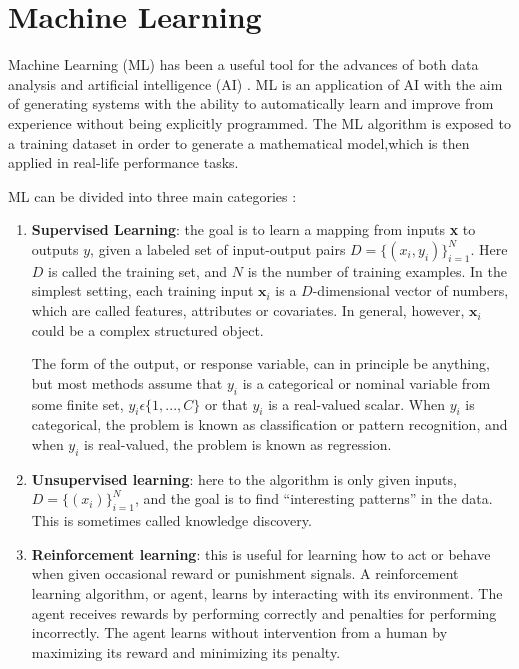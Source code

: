 \documentclass[a4paper, oneside]{book}
\begin{document}
		
		
	\chapter{Machine Learning}
		Machine Learning (ML) has been a useful tool for the advances of both data analysis and artificial intelligence (AI) \cite{Lifelong ML}. ML is an application of AI with the aim of generating systems with the ability to automatically learn and improve from experience without being explicitly programmed. The ML algorithm is exposed to a training dataset in order to generate a mathematical model,which is then applied in real-life performance tasks. %
		
		ML can be divided into three main categories \cite{ML categories}:
		\begin{enumerate}
			\item \textbf{Supervised Learning}: the goal is to learn a mapping from inputs \textbf{x} to outputs $y$, given a labeled set of input-output pairs $D = \{(x_i, y_i)\}_{i=1}^{N}$. Here $D$ is called the training set, and $N$ is the number of training examples. In the simplest setting, each training input $\textbf{x}_i$ is a $D$-dimensional vector of numbers, which are called features, attributes or covariates. In general, however, $\textbf{x}_i$ could be a complex structured object.
			
			The form of the output, or response variable, can in principle be anything, but most methods assume that $y_i$ is a categorical or nominal variable from some finite set, $y_i \epsilon  \{1, . . . , C\}$ or that $y_i$ is a real-valued scalar. When $y_i$ is categorical, the problem is known as classification or pattern recognition, and when $y_i$ is real-valued, the problem is known as regression.
			
			\item \textbf{Unsupervised learning}: here to the algorithm is only given inputs, $D = \{(x_i)\}_{i=1}^{N}$, and the goal is to find “interesting patterns” in the data. This is sometimes called knowledge discovery. %
			
			\item \textbf{Reinforcement learning}: this is useful for learning how to act or behave when given occasional reward or punishment signals. A reinforcement learning algorithm, or agent, learns by interacting with its environment. The agent receives rewards by performing correctly and penalties for performing incorrectly. The agent learns without intervention from a human by maximizing its reward and minimizing its penalty.
			
		\end{enumerate}
\end{document}
